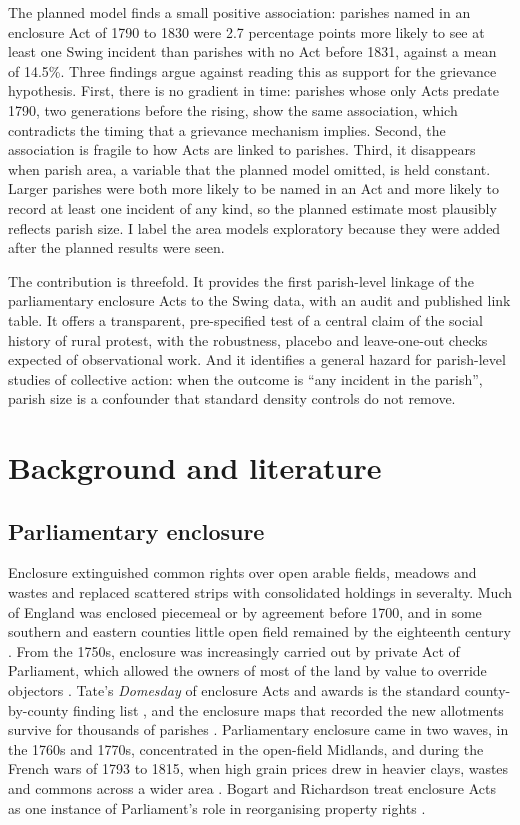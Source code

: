 \documentclass[11pt,a4paper]{article}
\begin{document}
The planned model finds a small positive association: parishes named in an enclosure Act of 1790 to 1830 were 2.7 percentage points more likely to see at least one Swing incident than parishes with no Act before 1831, against a mean of 14.5\%. Three findings argue against reading this as support for the grievance hypothesis. First, there is no gradient in time: parishes whose only Acts predate 1790, two generations before the rising, show the same association, which contradicts the timing that a grievance mechanism implies. Second, the association is fragile to how Acts are linked to parishes. Third, it disappears when parish area, a variable that the planned model omitted, is held constant. Larger parishes were both more likely to be named in an Act and more likely to record at least one incident of any kind, so the planned estimate most plausibly reflects parish size. I label the area models exploratory because they were added after the planned results were seen.

The contribution is threefold. It provides the first parish-level linkage of the parliamentary enclosure Acts to the Swing data, with an audit and published link table. It offers a transparent, pre-specified test of a central claim of the social history of rural protest, with the robustness, placebo and leave-one-out checks expected of observational work. And it identifies a general hazard for parish-level studies of collective action: when the outcome is ``any incident in the parish'', parish size is a confounder that standard density controls do not remove.

\section{Background and literature}
\subsection{Parliamentary enclosure}
Enclosure extinguished common rights over open arable fields, meadows and wastes and replaced scattered strips with consolidated holdings in severalty. Much of England was enclosed piecemeal or by agreement before 1700, and in some southern and eastern counties little open field remained by the eighteenth century \citep{wordie1983}. From the 1750s, enclosure was increasingly carried out by private Act of Parliament, which allowed the owners of most of the land by value to override objectors \citep{turner1980,mingay1997}. Tate's \textit{Domesday} of enclosure Acts and awards is the standard county-by-county finding list \citep{tate1978}, and the enclosure maps that recorded the new allotments survive for thousands of parishes \citep{kain2004}. Parliamentary enclosure came in two waves, in the 1760s and 1770s, concentrated in the open-field Midlands, and during the French wars of 1793 to 1815, when high grain prices drew in heavier clays, wastes and commons across a wider area \citep{turner1980,turner1984}. Bogart and Richardson treat enclosure Acts as one instance of Parliament's role in reorganising property rights \citep{bogartrichardson2011}.
\end{document}
